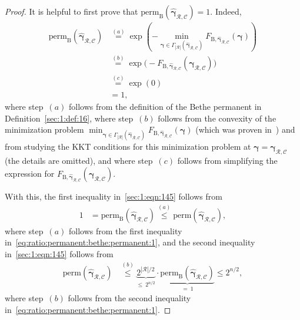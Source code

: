 \documentclass[journal,lettersize,twocolumn]{IEEEtran} %
\newcommand{\vect}[1]{ \bm{#1} }
\newcommand{\set}[1]{\mathcal{#1}}
\newcommand{\vgam}{ \vect{\gamma} }
\newcommand{\perm}{ \mathrm{perm} }
\newcommand{\permb}{ \mathrm{perm}_{\mathrm{B}} }
\newcommand{\setC}{\set{C}}
\newcommand{\setR}{\set{R}}
\newcommand{\vgamRCp}{\vgam_{\setR,\setC}}
\newcommand{\hvgamRCp}{ \hat{\vgam}_{\setR,\setC} }
\begin{document}
\begin{proof}
  It is helpful to first prove that $\permb(\hvgamRCp) = 1$. Indeed,
  \begin{align*}
    \permb(\hvgamRCp)
      &\overset{(a)}{=} 
         \exp
           \left(
             - \min_{\vgam \in \Gamma_{|\setR|}(\hvgamRCp)}
                 F_{\mathrm{B},\hvgamRCp}( \vgam )
           \right) \\
      &\overset{(b)}{=}
         \exp\bigl( - F_{\mathrm{B},\hvgamRCp}( \vgamRCp ) \bigr) \\
      &\overset{(c)}{=} \exp(0) \\
      &= 1,
  \end{align*}
  where step~$(a)$ follows from the definition of the Bethe permanent in
  Definition~\ref{sec:1:def:16}, where step~$(b)$ follows from the convexity
  of the minimization problem
  $\min_{\vgam \in \Gamma_{|\setR|}(\hvgamRCp)} F_{\mathrm{B},\hvgamRCp}(
  \vgam )$ (which was proven in~\cite{Vontobel2013a}) and from studying the
  KKT conditions for this minimization problem at $\vgam = \vgamRCp$ (the
  details are omitted), and where step~$(c)$ follows from simplifying the
  expression for $F_{\mathrm{B},\hvgamRCp}( \vgamRCp )$.

  With this, the first inequality in~\eqref{sec:1:eqn:145} follows from
  \begin{align}
    1
      &= \permb(\hvgamRCp)
       \overset{(a)}{\leq}
         \perm(\hvgamRCp),
  \end{align}
  where step~$(a)$ follows from the first inequality
  in~\eqref{eq:ratio:permanent:bethe:permanent:1}, and the second inequality
  in~\eqref{sec:1:eqn:145} follows from
  \begin{align*}
    \perm(\hvgamRCp) 
      &\overset{(b)}{\leq}
         \underbrace
         {
           2^{|\setR|/2}
         }_{\leq \ 2^{n/2}} 
         \cdot
         \underbrace{
           \permb(\hvgamRCp)
         }_{= \ 1}
       \leq 
         2^{n/2},
  \end{align*}
  where step~$(b)$ follows from the second inequality
  in~\eqref{eq:ratio:permanent:bethe:permanent:1}.


\end{proof}
\end{document}
